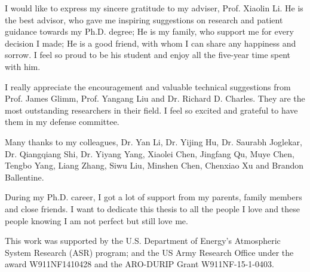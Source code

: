 I would like to express my sincere gratitude to my adviser, Prof. 
Xiaolin Li. He is the best advisor, who gave me inspiring suggestions
on research and patient guidance towards my Ph.D. degree; He is my family, who 
support me for every decision I made; He is a good friend, with whom I can share
any happiness and sorrow. I feel so proud to be his student and enjoy all the
five-year time spent with him.

I really appreciate the encouragement and valuable technical suggestions from
Prof. James Glimm, Prof. Yangang Liu and Dr. Richard D. Charles.
They are the most outstanding researchers in their field. I feel so
excited and grateful to have them in my defense committee.  

Many thanks to my colleagues, Dr. Yan Li, Dr. Yijing Hu, Dr.  Saurabh Joglekar, Dr. Qiangqiang Shi, 
Dr. Yiyang Yang, Xiaolei Chen, Jingfang Qu, Muye Chen, 
Tengbo Yang, Liang Zhang, Siwu Liu, Minshen Chen, Chenxiao Xu and Brandon Ballentine.

During my Ph.D. career, I got a lot of support from my parents, family 
members and close friends. I want to dedicate this thesis to all the people
I love and these people knowing I am not perfect but still love me.

This work was supported by the U.S. Department of Energy's Atmospheric System Research (ASR) program; and the US Army Research Office under the award W911NF1410428 and the ARO-DURIP Grant W911NF-15-1-0403.

